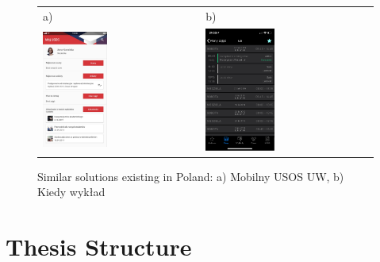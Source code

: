 \begin{figure}[htb]
    \centering
    \begin{tabular}{@{}ll@{}}
        a) & b) \\
        \includegraphics[width=0.425\textwidth]{fig01/mobilny-usos.png} &
        \includegraphics[width=0.425\textwidth]{fig01/kiedy-wyklad.png} \\
    \end{tabular}
    \caption{Similar solutions existing in Poland: a) Mobilny USOS UW, b) Kiedy wykład} \label{fig:similiar-solutions}
\end{figure}

\section{Thesis Structure}
